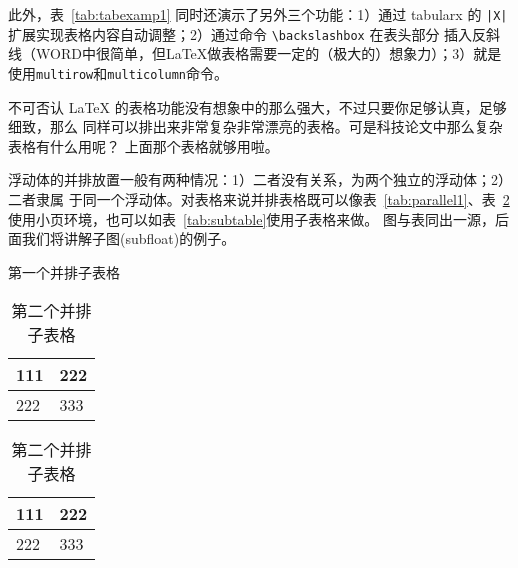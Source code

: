 此外，表~\ref{tab:tabexamp1} 同时还演示了另外三个功能：1）通过 \textsf{tabularx} 的
\texttt{|X|} 扩展实现表格内容自动调整；2）通过命令 \verb|\backslashbox| 在表头部分
插入反斜线（WORD中很简单，但\LaTeX{}做表格需要一定的（极大的）想象力）；3）就是
使用\verb|multirow|和\verb|multicolumn|命令。

不可否认 \LaTeX{} 的表格功能没有想象中的那么强大，不过只要你足够认真，足够细致，那么
同样可以排出来非常复杂非常漂亮的表格。可是科技论文中那么复杂表格有什么用呢？
上面那个表格就够用啦。

浮动体的并排放置一般有两种情况：1）二者没有关系，为两个独立的浮动体；2）二者隶属
于同一个浮动体。对表格来说并排表格既可以像表~\ref{tab:parallel1}、表~\ref{tab:parallel2}
使用小页环境，也可以如表~\ref{tab:subtable}使用子表格来做。
图与表同出一源，后面我们将讲解子图(subfloat)的例子。
\begin{table}[htb]
  \centering
  \noindent\begin{minipage}{0.45\textwidth}
    \centering
    \caption{第一个并排子表格}
    \label{tab:parallel1}
    \begin{tabular}{p{2cm}p{2cm}}
      \toprule[1.5pt]
      111 & 222 \\\midrule[1pt]
      222 & 333 \\\bottomrule[1.5pt]
    \end{tabular}
  \end{minipage}
  \begin{minipage}{0.45\textwidth}
    \centering
    \caption{第二个并排子表格}
    \label{tab:parallel2}
    \begin{tabular}{p{2cm}p{2cm}}
      \toprule[1.5pt]
      111 & 222 \\\midrule[1pt]
      222 & 333 \\\bottomrule[1.5pt]
    \end{tabular}
  \end{minipage}
\end{table}
\begin{table}[htbp]
  \centering
  \caption{并排子表格}
  \label{tab:subtable}
  \hskip2cm
\end{table}

